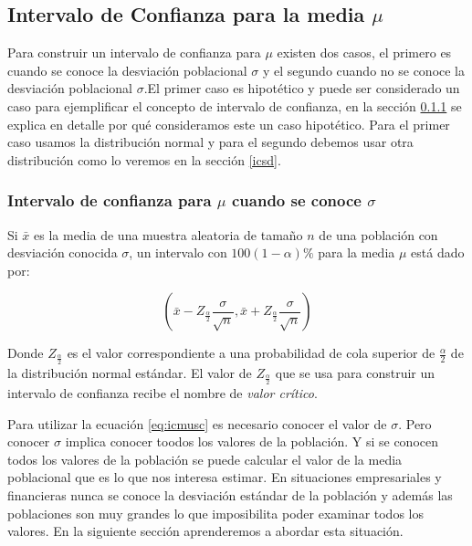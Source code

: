 \documentclass[]{book}
\begin{document}
\hypertarget{intervalo-de-confianza-para-la-media-mu}{%
\subsection{\texorpdfstring{Intervalo de Confianza para la media \(\mu\)}{Intervalo de Confianza para la media \textbackslash{}mu}}\label{intervalo-de-confianza-para-la-media-mu}}

Para construir un intervalo de confianza para \(\mu\) existen dos casos, el primero es cuando se conoce la desviación poblacional \(\sigma\) y el segundo cuando no se conoce la desviación poblacional \(\sigma\).El primer caso es hipotético y puede ser considerado un caso para ejemplificar el concepto de intervalo de confianza, en la sección \ref{jt} se explica en detalle por qué consideramos este un caso hipotético. Para el primer caso usamos la distribución normal y para el segundo debemos usar otra distribución como lo veremos en la sección \ref{icsd}.

\hypertarget{jt}{%
\subsubsection{\texorpdfstring{Intervalo de confianza para \(\mu\) cuando se conoce \(\sigma\)}{Intervalo de confianza para \textbackslash{}mu cuando se conoce \textbackslash{}sigma}}\label{jt}}

Si \(\bar{x}\) es la media de una muestra aleatoria de tamaño \(n\) de una población con desviación conocida \(\sigma\), un intervalo con \(100\left(1-\alpha\right)\%\) para la media \(\mu\) está dado por:

\begin{equation} 
  \left(\bar{x} - Z_{\frac{\alpha}{2}}\dfrac{\sigma}{\sqrt{n}}, \bar{x} + Z_{\frac{\alpha}{2}}\dfrac{\sigma}{\sqrt{n}}  \right)
  \label{eq:icmusc}
\end{equation}

Donde \(Z_{\frac{\alpha}{2}}\) es el valor correspondiente a una probabilidad de cola superior de \(\frac{\alpha}{2}\) de la distribución normal estándar. El valor de \(Z_{\frac{\alpha}{2}}\) que se usa para construir un intervalo de confianza recibe el nombre de \emph{valor crítico}.

Para utilizar la ecuación \eqref{eq:icmusc} es necesario conocer el valor de \(\sigma\). Pero conocer \(\sigma\) implica conocer toodos los valores de la población. Y si se conocen todos los valores de la población se puede calcular el valor de la media poblacional que es lo que nos interesa estimar. En situaciones empresariales y financieras nunca se conoce la desviación estándar de la población y además las poblaciones son muy grandes lo que imposibilita poder examinar todos los valores. En la siguiente sección aprenderemos a abordar esta situación.
\end{document}
